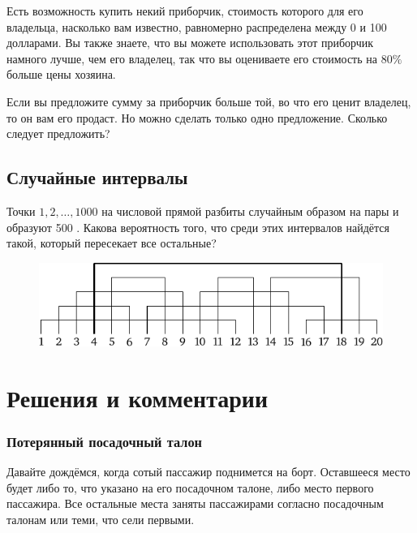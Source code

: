 \documentclass[twoside]{book}
\makeatletter
\newcommand{\rindex}[2][\imki@jobname]{%
  \index[#1]{\detokenize{#2}}%
}
\makeatother
\begin{document}
Есть возможность купить некий приборчик, стоимость которого для его владельца, насколько вам известно, равномерно распределена между 0 и 100 долларами.
Вы также знаете, что вы можете использовать этот приборчик намного лучше, чем его владелец, так что вы оцениваете его стоимость на $80\%$ больше цены хозяина.

\medskip

Если вы предложите сумму за приборчик больше той, во что его ценит владелец, то он вам его продаст.
Но можно сделать только одно предложение.
Сколько следует предложить?

\subsection*{Случайные интервалы}%
\rindex{Случайные интервалы}

Точки $1, 2,\dots, 1000$ на числовой прямой разбиты случайным образом на пары и образуют 500 .
Какова вероятность того, что среди этих интервалов найдётся такой, который пересекает все остальные?

\begin{figure}[!ht]
\centering
\includegraphics{mp/wink-4}
\end{figure}


\section*{Решения и комментарии}

\subsubsection*{Потерянный посадочный талон}%

Давайте дождёмся, когда сотый пассажир поднимется на борт. 
Оставшееся место будет либо то, что указано на его посадочном талоне, либо место первого пассажира.
Все остальные места заняты пассажирами согласно посадочным талонам или теми, что сели первыми.
\end{document}
